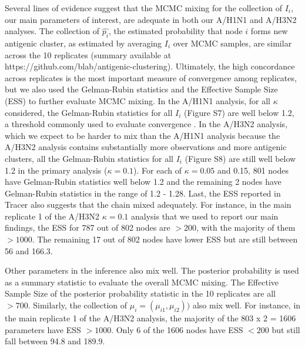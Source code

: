 \documentclass[11pt,oneside,letterpaper]{article}
\begin{document}
Several lines of evidence suggest that the MCMC mixing for the collection of $I_i$, our main parameters of interest, are adequate in both our A/H1N1 and A/H3N2 analyses. 
The collection of $\hat{p_i}$, the estimated probability that node $i$ forms new antigenic cluster, as estimated by averaging $I_i$ over MCMC samples, are  similar across the 10 replicates (summary available at https://github.com/blab/antigenic-clustering).
Ultimately, the high concordance across replicates is the most important measure of convergence among replicates, but we also used the Gelman-Rubin statistics and the Effective Sample Size (ESS) to further evaluate MCMC mixing.
In the A/H1N1 analysis, for all $\kappa$ considered, the Gelman-Rubin statistics for all $I_i$ (Figure S7) are well below 1.2, a threshold commonly used to  evaluate convergence \cite{Yang_evolutionbook}. 
In the A/H3N2 analysis, which we expect to be harder to mix than the A/H1N1 analysis because the A/H3N2 analysis contains substantially more observations and more antigenic clusters, all the Gelman-Rubin statistics for all $I_i$ (Figure S8) are still well below 1.2 in the primary analysis ($\kappa = 0.1$).
For each of $\kappa = 0.05$ and 0.15, 801 nodes have Gelman-Rubin statistics well below 1.2 and the remaining 2 nodes have Gelman-Rubin statistics in the range of 1.2 - 1.28.
Last, the ESS reported in Tracer \cite{beast04} also suggests that the chain mixed adequately.
For instance, in the main replicate 1 of the A/H3N2 $\kappa=0.1$ analysis that we used to report our main findings, the ESS for 787 out of 802 nodes are $> 200$, with the majority of them $>1000$.
The remaining 17 out of 802 nodes have lower ESS but are still between 56 and 166.3.


Other parameters in the inference also mix well.
The posterior probability is used as a summary statistic to evaluate the overall MCMC mixing.
The Effective Sample Size of the posterior probability statistic in the 10 replicates are all $>700$.
Similarly, the collection of $\mu_i = (\mu_{i1}, \mu_{i2}))$ also mix well.
For instance, in the main replicate 1 of the A/H3N2 analysis, the majority of the 803 x 2 = 1606 parameters have ESS $> 1000$.
Only 6 of the 1606 nodes have ESS $<200$ but still fall between 94.8 and 189.9. 
\end{document}
